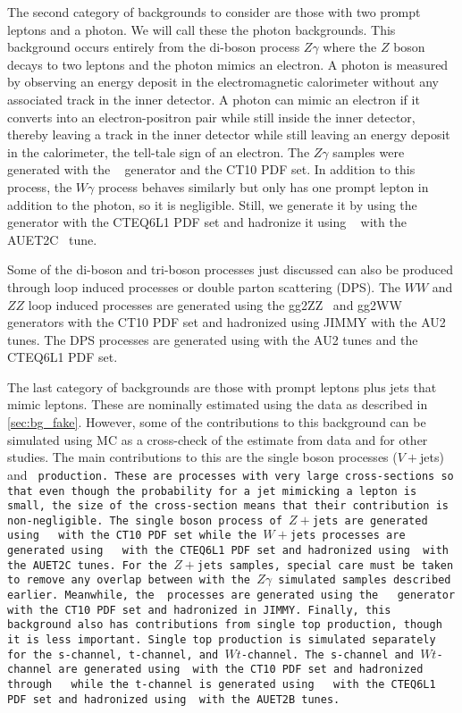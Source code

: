 The second category of backgrounds to consider are those with two 
prompt leptons and a photon. We will call these the photon backgrounds.
This background occurs entirely from the di-boson process $Z\gamma$
where the $Z$ boson decays to two leptons and the photon mimics an electron.
A photon is measured
by observing an energy deposit in the electromagnetic calorimeter 
without any associated track in the inner detector.
A photon can mimic an electron
if it converts into an electron-positron
pair while still inside the inner detector, thereby leaving a track 
in the inner detector while still leaving an energy deposit in the 
calorimeter, the tell-tale sign of an electron.
The $Z\gamma$ samples were generated with the \sherpa~\cite{sherpa} generator 
and the CT10 PDF set.  %
In addition to this process, the $W\gamma$ process behaves similarly 
but only has one prompt lepton in addition to the photon, so it is negligible.
Still, we generate it by using
the \alpgen~\cite{ALPGEN} generator with the CTEQ6L1 PDF set
and hadronize it using \jimmy~\cite{Jimmy} with the AUET2C~\cite{ATL-PHYS-PUB-2011-009} 
tune.

Some of the di-boson and tri-boson processes just discussed can also be produced
through loop induced processes or double parton scattering (DPS).
The $WW$ and $ZZ$
loop induced processes are generated using the gg2ZZ~\cite{Binoth:2008pr} 
and gg2WW~\cite{Binoth:2006mf} generators with the CT10 PDF set and
hadronized using JIMMY with the AU2 tunes.
The DPS
processes are generated using \pythiaeight with the AU2 
tunes and the CTEQ6L1 PDF set. 

The last category of backgrounds are those with prompt leptons plus
jets that mimic leptons. These are nominally estimated using the data
as described in \sec\ref{sec:bg_fake}. However, some of the contributions
to this background can be simulated using MC as a cross-check of 
the estimate from data and for other studies. The main contributions
to this are the single boson processes ($V+$jets) and \tt~production.
These are processes with very large cross-sections so
that even though the probability for a jet mimicking a lepton is small,
the size of the cross-section means that their contribution is non-negligible.
The single boson process of $Z+$jets are generated using \sherpa~ with the CT10
PDF set while the $W+$jets processes are generated using \alpgen~ with
the CTEQ6L1 PDF set and hadronized using \jimmy~with the AUET2C tunes.
For the $Z+$jets samples, special care must be taken to remove any overlap 
between with the $Z\gamma$ simulated samples described earlier.
Meanwhile, the \tt~processes are generated using the \mcatnlo~\cite{MCatNLO}
generator with the CT10 PDF set and hadronized in JIMMY.  %
Finally, this background also has contributions from single top production,
though it is less important. Single top production is simulated separately 
for the s-channel, t-channel, and $Wt$-channel. The s-channel 
and $Wt$-channel are generated using \mcatnlo~with the CT10 PDF set and 
hadronized through \jimmy~ while the t-channel is generated using \madgraph~
with the CTEQ6L1 PDF set and hadronized using \pythiasix~with the AUET2B tunes.

